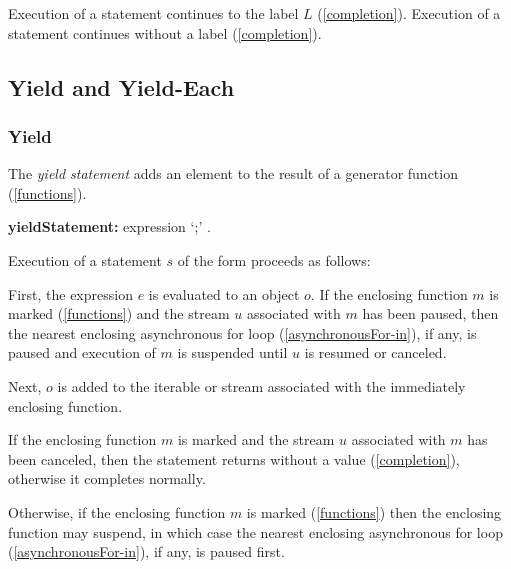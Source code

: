 \documentclass{article}
\begin{document}
\LMHash{}
Execution of a \CONTINUE{} statement  continues to the label $L$ (\ref{completion}).
Execution of a \CONTINUE{} statement \code{\CONTINUE{};} continues without a label (\ref{completion}).


\subsection{Yield and Yield-Each}


\subsubsection{Yield}

\LMHash{}
The {\em yield statement} adds an element to the result of a generator function (\ref{functions}).

\begin{grammar}
{\bf yieldStatement:}\YIELD{} expression `{\escapegrammar ;}'
  .
\end{grammar}

\LMHash{}
Execution of a statement $s$ of the form  proceeds as follows:

\LMHash{}
First, the expression $e$ is evaluated to an object $o$.
If the enclosing function $m$ is marked \ASYNC* (\ref{functions}) and the stream $u$ associated with $m$ has been paused, then the nearest enclosing asynchronous for loop (\ref{asynchronousFor-in}), if any, is paused and execution of $m$ is suspended until $u$ is resumed or canceled.

\LMHash{}
Next, $o$ is added to the iterable or stream associated with the immediately enclosing function.

\LMHash{}
If the enclosing function $m$ is marked \ASYNC* and the stream $u$ associated with $m$ has been canceled, then the \YIELD{} statement returns without a value (\ref{completion}), otherwise it completes normally.


\LMHash{}
Otherwise, if the enclosing function $m$ is marked \ASYNC* (\ref{functions}) then the enclosing function may suspend, in which case the nearest enclosing asynchronous for loop (\ref{asynchronousFor-in}), if any, is paused first.
\end{document}
